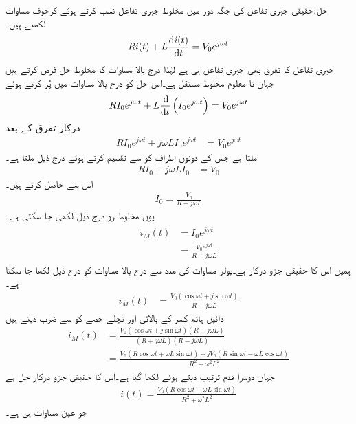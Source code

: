 حل:حقیقی جبری تفاعل  کی جگہ دور میں مخلوط جبری تفاعل  نسب کرتے ہوئے کرخوف مساوات لکھتے ہیں۔
\begin{align*}
R i(t) +L\frac{\dif i(t)}{\dif t}=V_0 e^{j \omega t}
\end{align*}
جبری تفاعل  کا تفرق  بھی جبری تفاعل ہی ہے لہٰذا درج بالا مساوات کا مخلوط حل  فرض  کرتے ہیں جہاں  نا معلوم مخلوط مستقل ہے۔اس حل کو درج بالا مساوات میں پُر کرتے ہوئے
\begin{align*}
R I_0 e^{j\omega t}+L \frac{\dif}{\dif t}\left(I_0 e^{j\omega t} \right)=V_0 e^{j \omega t}
\end{align*}
درکار تفرق کے بعد
\begin{align}\label{مساوات_بدلتا_مخلوط_الف}
R I_0  e^{j \omega t}+j \omega L I_0e^{j\omega t}&=V_0 e^{j \omega t}
\end{align}
ملتا ہے جس کے دونوں اطراف کو  سے تقسیم کرتے ہوئے درج ذیل ملتا ہے۔
\begin{align}\label{مساوات_بدلتا_مخلوط_ب}
R I_0+j \omega L I_0&=V_0 
\end{align}
اس سے  حاصل کرتے ہیں۔
\begin{align}\label{مساوات_بدلتا_مخلوط_مستقل_الف}
I_0=\frac{V_0}{R+j\omega L}
\end{align}
یوں مخلوط رو درج ذیل لکھی جا سکتی ہے۔
\begin{gather}
\begin{aligned}\label{مساوات_بدلتا_مخلوط_پ}
i_M(t)&=I_0 e^{j\omega t}\\
&=\frac{V_0 e^{j\omega t}}{R+j\omega L}
\end{aligned}
\end{gather}
ہمیں اس کا حقیقی جزو درکار ہے۔یولر مساوات کی مدد سے درج بالا مساوات کو درج ذیل لکھا جا سکتا ہے۔
\begin{align*}
i_M(t)&=\frac{V_0 (\cos \omega t+j \sin \omega t)}{R+j\omega L}
\end{align*}
دائیں ہاتھ کسر کے بالائی اور نچلے حصے کو  سے ضرب دیتے ہیں
 \begin{align*}
i_M(t)&=\frac{V_0 (\cos \omega t+j \sin \omega t)(R-j\omega L)}{(R+j\omega L)(R-j\omega L)}\\
&=\frac{V_0(R \cos \omega t+\omega L \sin \omega t)+jV_0(R\sin \omega t-\omega L \cos \omega t)}{R^2+\omega^2 L^2}
\end{align*}
جہاں دوسرا قدم ترتیب دیتے ہوئے لکھا گیا ہے۔اس کا حقیقی جزو درکار حل ہے
\begin{align}\label{مساوات_بدلتا_مخلوط_ت}
i(t)=\frac{V_0(R \cos \omega t+\omega L \sin \omega t)}{R^2+\omega^2 L^2}
\end{align}
جو عین مساوات  ہی ہے۔

